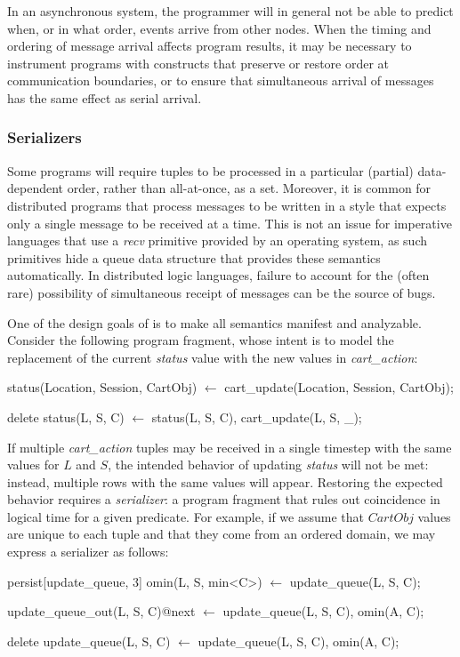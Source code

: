 \noindent{}In an asynchronous system, the programmer will in general not be able to
predict when, or in what order, events arrive from other nodes.  When the timing and 
ordering of message arrival affects program results, it may be necessary to instrument
programs with constructs that preserve or restore order at communication boundaries,
or to ensure that simultaneous arrival of messages has the same effect as serial arrival.


\subsubsection{Serializers}

Some programs will require tuples to be processed in a particular (partial)
data-dependent order, rather than all-at-once, as a set.  Moreover, it is 
common for distributed programs that process messages to be written in
a style that expects only a single message to be received at a time.   This 
is not an issue for imperative languages that use a {\em recv} primitive
provided by an operating system, as such primitives hide a queue data structure
that provides these semantics automatically.  In distributed logic languages,
failure to account for the (often rare) possibility of simultaneous receipt of messages
can be the source of bugs.

One of the design goals of \lang is to make all semantics manifest and analyzable.
Consider the following program fragment, whose intent is to model the replacement of the 
current {\em status} value with the new values in {\em cart\_action}:
\begin{Dedalus}
status(Location, Session, CartObj) \(\leftarrow\)
    cart_update(Location,  Session, CartObj);
    
delete status(L, S, C) \(\leftarrow\)
    status(L, S, C), cart_update(L, S, _);
\end{Dedalus}

If multiple {\em cart\_action} tuples may be received in a single timestep with the same
values for $L$ and $S$, the intended behavior of updating {\em status} will not be met:
instead, multiple rows with the same values will appear.  Restoring the expected behavior
requires a \emph{serializer}: a program fragment that rules out coincidence in logical time 
for a given predicate.  For example, if we assume that $CartObj$ values are unique to each
tuple and that they come from an ordered domain, we may express a serializer as follows:

\begin{Dedalus}
persist[update_queue, 3]
omin(L, S, min<C>) \(\leftarrow\)
  update_queue(L, S, C);

update_queue_out(L, S, C)@next \(\leftarrow\)
  update_queue(L, S, C), omin(A, C);

delete update_queue(L, S, C) \(\leftarrow\)
  update_queue(L, S, C), omin(A, C);
\end{Dedalus}

